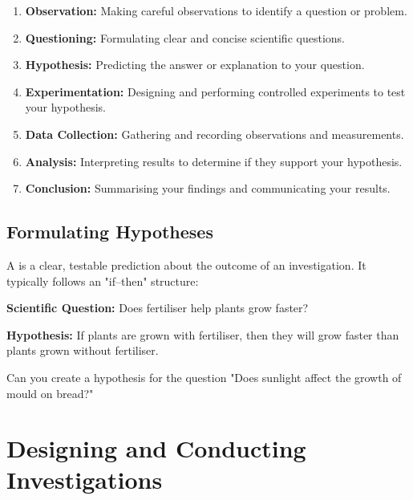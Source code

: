 \begin{enumerate}
    \item \textbf{Observation:} Making careful observations to identify a question or problem.
    \item \textbf{Questioning:} Formulating clear and concise scientific questions.
    \item \textbf{Hypothesis:} Predicting the answer or explanation to your question.
    \item \textbf{Experimentation:} Designing and performing controlled experiments to test your hypothesis.
    \item \textbf{Data Collection:} Gathering and recording observations and measurements.
    \item \textbf{Analysis:} Interpreting results to determine if they support your hypothesis.
    \item \textbf{Conclusion:} Summarising your findings and communicating your results.
\end{enumerate}


\subsection{Formulating Hypotheses}

A  is a clear, testable prediction about the outcome of an investigation. It typically follows an "if–then" structure:

\begin{example}
\textbf{Scientific Question:} Does fertiliser help plants grow faster?

\textbf{Hypothesis:} If plants are grown with fertiliser, then they will grow faster than plants grown without fertiliser.
\end{example}

\begin{stopandthink}
Can you create a hypothesis for the question "Does sunlight affect the growth of mould on bread?"
\end{stopandthink}

\section{Designing and Conducting Investigations}

